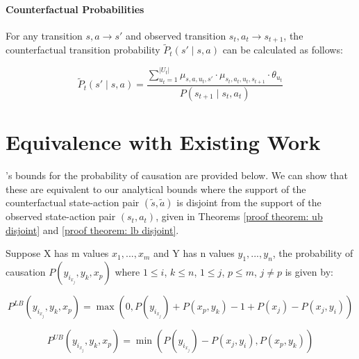 \paragraph{Counterfactual Probabilities}
For any transition $s, a \rightarrow s'$ and observed transition $s_t, a_t \rightarrow s_{t+1}$, the counterfactual transition probability $\tilde{P}_t(s' \mid s, a)$ can be calculated as follows:

\begin{equation}
\label{eq: counterfactual probability}
   \tilde{P}_t(s' \mid s, a)= \dfrac{\sum_{u_t = 1}^{|U_t|} \mu_{s, a, u_t, s'} \cdot \mu_{s_t, a_t, u_t, s_{t+1}} \cdot \theta_{u_t}}{P(s_{t+1} \mid s_t, a_t)} 
\end{equation}





\pagebreak


\pagebreak
\section{Equivalence with Existing Work}
\label{app: equivalence proofs}
\citet{li2024probabilities}'s bounds for the probability of causation are provided below. We can show that these are equivalent to our analytical bounds where the support of the counterfactual state-action pair $(\tilde{s}, \tilde{a})$ is disjoint from the support of the observed state-action pair $(s_t, a_t)$, given in Theorems \ref{proof theorem: ub disjoint} and \ref{proof theorem: lb disjoint}.

\begin{theorem}
    Suppose X has m values $x_1, ..., x_m$ and Y has n values $y_1, ..., y_n$, the probability of causation $P(y_{i_{x_j}}, y_k, x_p)$ where $1 \leq i$, $k \leq n$, $1 \leq j$, $p \leq m$, $j \neq p$ is given by:

    \[
    P^{LB}(y_{i_{x_j}}, y_k, x_p) = \max(0, P(y_{i_{x_j}}) + P(x_p, y_k)  -1 + P(x_j) - P(x_j, y_i))
    \]

    \[
    P^{UB}(y_{i_{x_j}}, y_k, x_p) = \min(P(y_{i_{x_j}}) - P(x_j, y_i), P(x_p, y_k))
    \]
\end{theorem}

